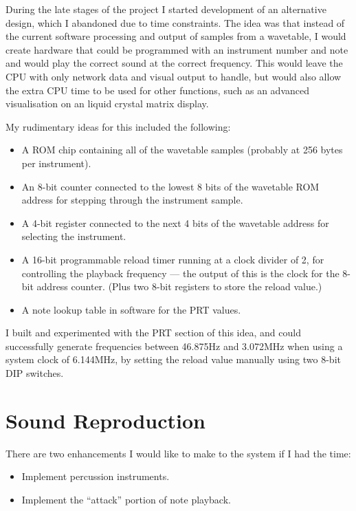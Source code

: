 During the late stages of the project I started development of an alternative design, which I 
abandoned due to time constraints.  The idea was that instead of the current software processing and 
output of samples from a wavetable, I would create hardware that could be programmed with an 
instrument number and note and would play the correct sound at the correct frequency.   This would 
leave the CPU with only network data and visual output to handle, but would also allow the extra CPU 
time to be used for other functions, such as an advanced visualisation on an liquid crystal matrix 
display.

My rudimentary ideas for this included the following:

\begin{itemize}
\item A ROM chip containing all of the wavetable samples (probably at 256 bytes per instrument).
\item An 8-bit counter connected to the lowest 8 bits of the wavetable ROM address for stepping 
through the instrument sample.
\item A 4-bit register connected to the next 4 bits of the wavetable address for selecting the 
instrument.
\item A 16-bit programmable reload timer running at a clock divider of 2, for controlling the 
playback frequency --- the output of this is the clock for the 8-bit address counter.  (Plus two 
8-bit registers to store the reload value.)
\item A note lookup table in software for the PRT values.
\end{itemize}

I built and experimented with the PRT section of this idea, and could successfully generate 
frequencies between 46.875Hz and 3.072MHz when using a system clock of 6.144MHz, by setting the 
reload value manually using two 8-bit DIP switches.

\section{Sound Reproduction}

There are two enhancements I would like to make to the system if I had the time:

\begin{itemize}
\item Implement percussion instruments.
\item Implement the ``attack'' portion of note playback.
\end{itemize}

